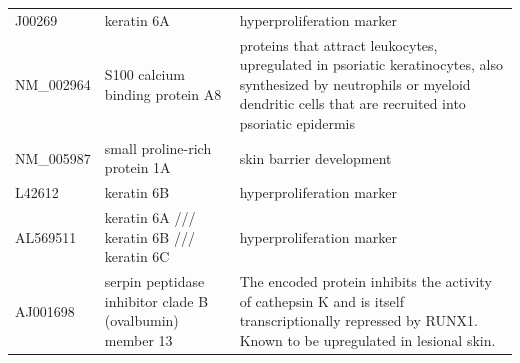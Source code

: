 \documentclass[10pt,a4paper]{article}
\begin{document}
\begin{table}[]
\begin{tabular}{l|p{4.5cm} p{8.5cm}}
		J00269             & keratin 6A                                                                                                              & hyperproliferation marker\cite{jiang2015biomarkers}                                                                                                                                                                                                                 \\
		NM\_002964         & S100 calcium binding protein A8                                                                                         & proteins that attract leukocytes, upregulated in psoriatic keratinocytes, also synthesized by neutrophils or myeloid dendritic cells that are recruited into psoriatic epidermis\cite{roberson2010psoriasis}                                                          \\
		NM\_005987         & small proline-rich protein 1A                                                                                           & skin barrier development\cite{bergboer2012genetics}                                                                                                                                                                                                                    \\
		L42612             & keratin 6B                                                                                                              & hyperproliferation marker\cite{jiang2015biomarkers}                                                                                                                                                                                                                  \\
		AL569511           & keratin 6A /// keratin 6B /// keratin 6C                                                                                & hyperproliferation marker\cite{jiang2015biomarkers}                                                                                                                                                                                                                  \\
		AJ001698           & serpin peptidase inhibitor  clade B (ovalbumin) member 13                                                               & The encoded protein inhibits the activity of cathepsin K and is itself transcriptionally repressed by RUNX1. Known to be upregulated in lesional skin.\cite{suarez2012expanding}                                                                                    \\

\end{tabular}
\end{table}
\end{document}
